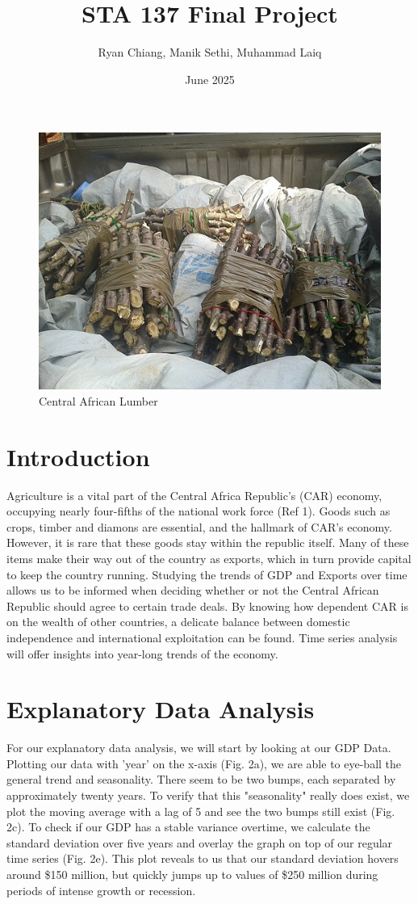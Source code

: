 \documentclass[11pt]{article}
\title{STA 137 Final Project}
\author{Ryan Chiang, Manik Sethi, Muhammad Laiq }
\date{June 2025}
\begin{document}
\maketitle


\begin{figure}[H]
    \centering
    \includegraphics[width=0.3\linewidth]{central_africa_republic.jpg}
    \caption{Central African Lumber}
    \label{fig:enter-label}
\end{figure}




\tableofcontents

\newcommand{\numberedpart}[1]{%
    \part{#1}%
}

\section{Introduction}

Agriculture is a vital part of the Central Africa Republic's (CAR) economy, occupying nearly four-fifths of the national work force (Ref 1). Goods such as crops, timber and diamons are essential, and the hallmark of CAR's economy. However, it is rare that these goods stay within the republic itself. Many of these items make their way out of the country as exports, which in turn provide capital to keep the country running.
Studying the trends of GDP and Exports over time allows us to be informed when deciding whether or not the Central African Republic should agree to certain trade deals. By knowing how dependent CAR is on the wealth of other countries, a delicate balance between domestic independence and international exploitation can be found. Time series analysis will offer insights into year-long trends of the economy.


\section{Explanatory Data Analysis}

For our explanatory data analysis, we will start by looking at our GDP Data. Plotting our data with 'year' on the x-axis (Fig. 2a), we are able to eye-ball the general trend and seasonality. There seem to be two bumps, each separated by approximately twenty years. To verify that this "seasonality" really does exist, we plot the moving average with a lag of 5 and see the two bumps still exist (Fig. 2c). To check if our GDP has a stable variance overtime, we calculate the standard deviation over five years and overlay the graph on top of our regular time series (Fig. 2e). This plot reveals to us that our standard deviation hovers around \$150 million, but quickly jumps up to values of \$250 million during periods of intense growth or recession.
\end{document}
